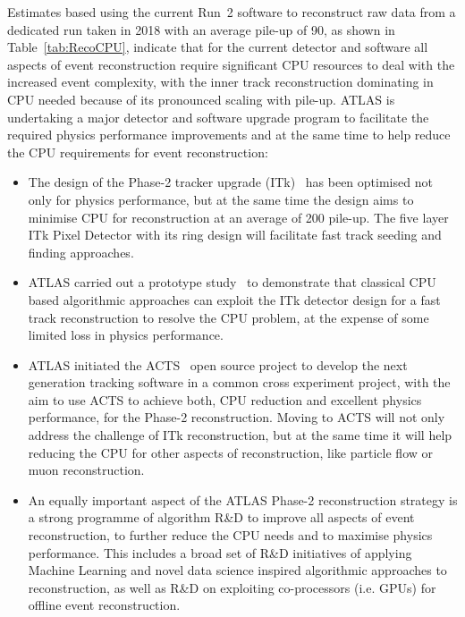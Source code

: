 Estimates based using the current Run~2 software to reconstruct raw data from a dedicated run taken in 2018 with an average pile-up of 90, as shown in Table~\ref{tab:RecoCPU}, indicate that for the current detector and software all aspects of event reconstruction require significant CPU resources to deal with the increased event complexity, with the inner track reconstruction dominating in CPU needed because of its pronounced scaling with pile-up. ATLAS is undertaking a major detector and software upgrade program to facilitate the required physics performance improvements and at the same time to help reduce the CPU requirements for event reconstruction:
%
\begin{itemize}
    \item 
    The design of the Phase-2 tracker upgrade (ITk)~\cite{ATL-PHYS-PUB-2019-014} has been optimised not only for physics performance, but at the same time the design aims to minimise CPU for reconstruction at an average of 200 pile-up. The five layer ITk Pixel Detector with its ring design will facilitate fast track seeding and finding approaches.
    \item
    ATLAS carried out a prototype study~\cite{ATL-PHYS-PUB-2019-041} to demonstrate that classical CPU based algorithmic approaches can exploit the ITk detector design for a fast track reconstruction to resolve the CPU problem, at the expense of some limited loss in physics performance.
    \item
    ATLAS initiated the ACTS~\cite{acts} open source project to develop the next generation tracking software in a common cross experiment project, with the aim to use ACTS to achieve both, CPU reduction and excellent physics performance, for the Phase-2 reconstruction. Moving to ACTS will not only address the challenge of ITk reconstruction, but at the same time it will help reducing the CPU for other aspects of reconstruction, like particle flow or muon reconstruction.
    \item
    An equally important aspect of the ATLAS Phase-2 reconstruction strategy is a strong programme of algorithm R\&D to improve all aspects of event reconstruction, to further reduce the CPU needs and to maximise physics performance. This includes a broad set of R\&D initiatives of applying Machine Learning and novel data science inspired algorithmic approaches to reconstruction, as well as R\&D on exploiting co-processors (i.e. GPUs) for offline event reconstruction. 
\end{itemize}

